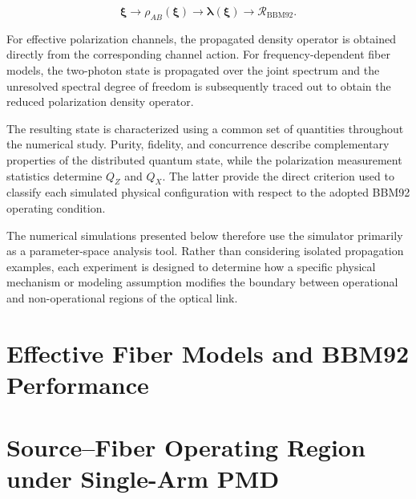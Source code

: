 \begin{equation}
\boxed{
\boldsymbol{\xi}
\longrightarrow
\rho_{AB}(\boldsymbol{\xi})
\longrightarrow
\boldsymbol{\lambda}(\boldsymbol{\xi})
\longrightarrow
\mathcal{R}_{\mathrm{BBM92}}.
}
\label{eq:numerical_workflow_chapter3}
\end{equation}

For effective polarization channels, the propagated density operator is obtained
directly from the corresponding channel action. For frequency-dependent fiber
models, the two-photon state is propagated over the joint spectrum and the
unresolved spectral degree of freedom is subsequently traced out to obtain the
reduced polarization density operator.

The resulting state is characterized using a common set of quantities throughout
the numerical study. Purity, fidelity, and concurrence describe complementary
properties of the distributed quantum state, while the polarization measurement
statistics determine \(Q_Z\) and \(Q_X\). The latter provide the direct criterion
used to classify each simulated physical configuration with respect to the
adopted BBM92 operating condition.

The numerical simulations presented below therefore use the simulator primarily
as a parameter-space analysis tool. Rather than considering isolated propagation
examples, each experiment is designed to determine how a specific physical
mechanism or modeling assumption modifies the boundary between operational and
non-operational regions of the optical link.



\section{Effective Fiber Models and BBM92 Performance}
\label{sec:effective_models_bbm92_performance}




\section{Source--Fiber Operating Region under Single-Arm PMD}
\label{sec:single_arm_pmd_operating_region}


